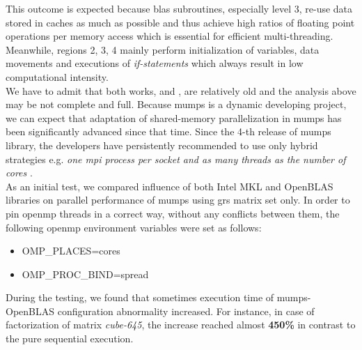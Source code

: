 This outcome is expected because \gls{blas} subroutines, especially level 3, re-use data stored in caches as much as possible and thus achieve high ratios of floating point operations per memory access which is essential for efficient multi-threading. Meanwhile, regions 2, 3, 4 mainly perform initialization of variables, data movements and executions of \textit{if-statements} which always result in low computational intensity.\\



We have to admit that both works, \cite{chowdhury2010some} and \cite{l2013introduction}, are relatively old and the analysis above may be not complete and full. Because \gls{mumps} is a dynamic developing project, we can expect that adaptation of shared-memory parallelization in \gls{mumps} has been significantly advanced since that time. Since the 4-th release of \gls{mumps} library, the developers have persistently recommended to use only hybrid strategies e.g. \textit{one \gls{mpi} process per socket and as many threads as the number of cores} \cite{mumps-manual}.\\


As an initial test, we compared influence of both Intel MKL and OpenBLAS libraries on parallel performance of \gls{mumps} using \gls{grs} matrix set only. In order to pin \gls{openmp} threads in a correct way, without any conflicts between them, the following \gls{openmp} environment variables were set as follows:

\begin{itemize}
	\item OMP\_PLACES=cores
	\item OMP\_PROC\_BIND=spread
\end{itemize} 


During the testing, we found that sometimes execution time of \gls{mumps}-OpenBLAS configuration abnormality increased. For instance, in case of factorization of matrix \textit{cube-645}, the increase reached almost \textbf{450\%} in contrast to the pure sequential execution. \\


